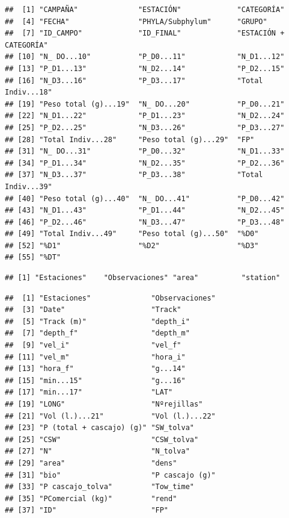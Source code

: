 \documentclass[
]{article}
\begin{document}
\begin{verbatim}
##  [1] "CAMPAÑA"              "ESTACIÓN"             "CATEGORÍA"           
##  [4] "FECHA"                "PHYLA/Subphylum"      "GRUPO"               
##  [7] "ID_CAMPO"             "ID_FINAL"             "ESTACIÓN + CATEGORÍA"
## [10] "N_ DO...10"           "P_D0...11"            "N_D1...12"           
## [13] "P_D1...13"            "N_D2...14"            "P_D2...15"           
## [16] "N_D3...16"            "P_D3...17"            "Total Indiv...18"    
## [19] "Peso total (g)...19"  "N_ DO...20"           "P_D0...21"           
## [22] "N_D1...22"            "P_D1...23"            "N_D2...24"           
## [25] "P_D2...25"            "N_D3...26"            "P_D3...27"           
## [28] "Total Indiv...28"     "Peso total (g)...29"  "FP"                  
## [31] "N_ DO...31"           "P_D0...32"            "N_D1...33"           
## [34] "P_D1...34"            "N_D2...35"            "P_D2...36"           
## [37] "N_D3...37"            "P_D3...38"            "Total Indiv...39"    
## [40] "Peso total (g)...40"  "N_ DO...41"           "P_D0...42"           
## [43] "N_D1...43"            "P_D1...44"            "N_D2...45"           
## [46] "P_D2...46"            "N_D3...47"            "P_D3...48"           
## [49] "Total Indiv...49"     "Peso total (g)...50"  "%D0"                 
## [52] "%D1"                  "%D2"                  "%D3"                 
## [55] "%DT"
\end{verbatim}

\begin{verbatim}
## [1] "Estaciones"    "Observaciones" "area"          "station"
\end{verbatim}

\begin{verbatim}
##  [1] "Estaciones"              "Observaciones"          
##  [3] "Date"                    "Track"                  
##  [5] "Track (m)"               "depth_i"                
##  [7] "depth_f"                 "depth_m"                
##  [9] "vel_i"                   "vel_f"                  
## [11] "vel_m"                   "hora_i"                 
## [13] "hora_f"                  "g...14"                 
## [15] "min...15"                "g...16"                 
## [17] "min...17"                "LAT"                    
## [19] "LONG"                    "Nºrejillas"             
## [21] "Vol (l.)...21"           "Vol (l.)...22"          
## [23] "P (total + cascajo) (g)" "SW_tolva"               
## [25] "CSW"                     "CSW_tolva"              
## [27] "N"                       "N_tolva"                
## [29] "area"                    "dens"                   
## [31] "bio"                     "P cascajo (g)"          
## [33] "P cascajo_tolva"         "Tow_time"               
## [35] "PComercial (kg)"         "rend"                   
## [37] "ID"                      "FP"
\end{verbatim}
\end{document}

